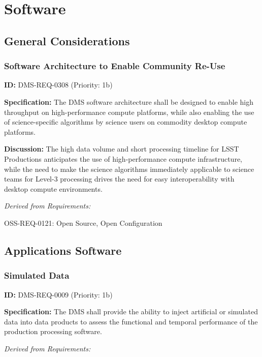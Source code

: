 \documentclass[SE,toc,lsstdraft]{lsstdoc}
\begin{document}
\section{Software}

\subsection{General Considerations}

\subsubsection{Software Architecture to Enable Community Re-Use}

\label{DMS-REQ-0308}
\textbf{ID:} DMS-REQ-0308 (Priority: 1b)

\textbf{Specification:} The DMS software architecture shall be designed to enable high throughput on high-performance compute platforms, while also enabling the use of science-specific algorithms by science users on commodity desktop compute platforms.

\textbf{Discussion: }The high data volume and short processing timeline for LSST Productions anticipates the use of high-performance compute infrastructure, while the need to make the science algorithms immediately applicable to science teams for Level-3 processing drives the need for easy interoperability with desktop compute environments.

\emph{Derived from Requirements:}

OSS-REQ-0121:
Open Source, Open Configuration \newline

\subsection{Applications Software}

\subsubsection{Simulated Data}

\label{DMS-REQ-0009}
\textbf{ID:} DMS-REQ-0009 (Priority: 1b)

\textbf{Specification:} The DMS shall provide the ability to inject artificial or simulated data into data products to assess the functional and temporal performance of the production processing software.

\emph{Derived from Requirements:}
\end{document}
